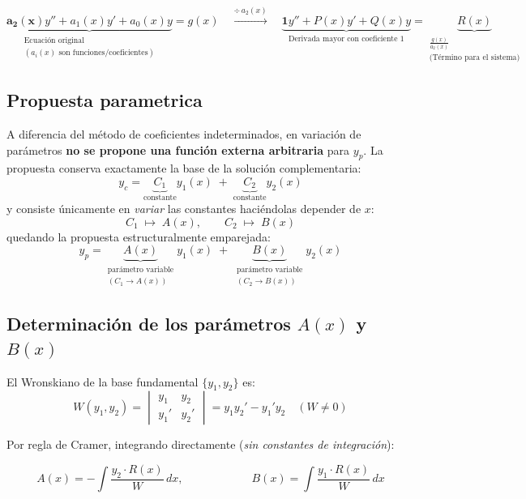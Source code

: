 \documentclass[10pt,letterpaper]{article}
\begin{document}
	\[
	\underbrace{\mathbf{a_2(x)} y'' + a_1(x) y' + a_0(x) y}_{\substack{\text{Ecuación original} \\ (a_i(x) \text{ son funciones/coeficientes})}} = g(x)
	\quad\xrightarrow{\div\, a_2(x)}\quad
	\underbrace{\mathbf{1}y'' + P(x)y' + Q(x)y}_{\text{Derivada mayor con coeficiente 1}} = \underbrace{R(x)}_{\substack{\frac{g(x)}{a_2(x)} \\ \text{(Término para el sistema)}}}
	\]
	
	\subsection*{Propuesta parametrica}
	A diferencia del método de coeficientes indeterminados, en variación de parámetros \textbf{no se propone una función externa arbitraria} para $y_p$. La propuesta conserva exactamente la base de la solución complementaria:
	\[
	y_c = \underbrace{C_1}_{\text{constante}} y_1(x) \;+\; \underbrace{C_2}_{\text{constante}} y_2(x)
	\]
	y consiste únicamente en \textit{variar} las constantes haciéndolas depender de $x$:
	\[
	C_1 \;\longmapsto\; A(x), \qquad C_2 \;\longmapsto\; B(x)
	\]
	quedando la propuesta estructuralmente emparejada:
	\[
	y_p = \underbrace{A(x)}_{\substack{\text{parámetro variable} \\ (C_1 \to A(x))}} y_1(x) \;+\; \underbrace{B(x)}_{\substack{\text{parámetro variable} \\ (C_2 \to B(x))}} y_2(x)
	\]

	
	\subsection*{Determinación de los parámetros $A(x)$ y $B(x)$}
	El Wronskiano de la base fundamental $\{y_1, y_2\}$ es:
	\vspace{0.5cm}
	\[
	W(y_1, y_2) = \begin{vmatrix} y_1 & y_2 \\ y_1' & y_2' \end{vmatrix} = y_1 y_2' - y_1' y_2 \quad (W \neq 0)
	\]
	
	\vspace{0.5cm}
	Por regla de Cramer, integrando directamente (\textit{sin constantes de integración}):
	
	\vspace{0.5cm}
	
	\[
	A(x) = -\int \frac{y_2 \cdot R(x)}{W} \, dx, \qquad \qquad \qquad B(x) = \int \frac{y_1 \cdot R(x)}{W} \, dx
	\]
	
	
	\vspace{0.5cm}
	
\end{document}
